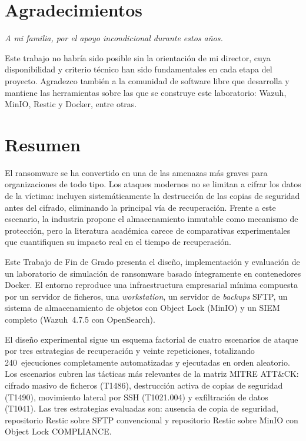 \documentclass[12pt,twoside]{book}
\begin{document}

\chapter*{Agradecimientos}
\thispagestyle{empty}

\begin{flushright}
\textit{A mi familia, por el apoyo incondicional durante estos años.}
\end{flushright}

Este trabajo no habría sido posible sin la orientación de mi director, cuya
disponibilidad y criterio técnico han sido fundamentales en cada etapa del proyecto.
Agradezco también a la comunidad de software libre que desarrolla y mantiene las
herramientas sobre las que se construye este laboratorio: Wazuh, MinIO, Restic y
Docker, entre otras.

\cleardoublepage

\chapter*{Resumen}

El ransomware se ha convertido en una de las amenazas más graves para organizaciones
de todo tipo. Los ataques modernos no se limitan a cifrar los datos de la víctima:
incluyen sistemáticamente la destrucción de las copias de seguridad antes del
cifrado, eliminando la principal vía de recuperación. Frente a este escenario, la
industria propone el almacenamiento inmutable como mecanismo de protección, pero la
literatura académica carece de comparativas experimentales que cuantifiquen su
impacto real en el tiempo de recuperación.

Este Trabajo de Fin de Grado presenta el diseño, implementación y evaluación de un
laboratorio de simulación de ransomware basado íntegramente en contenedores Docker.
El entorno reproduce una infraestructura empresarial mínima compuesta por un
servidor de ficheros, una \textit{workstation}, un servidor de \textit{backups}
SFTP, un sistema de almacenamiento de objetos con Object Lock (MinIO) y un SIEM
completo (Wazuh~4.7.5 con OpenSearch).

El diseño experimental sigue un esquema factorial de cuatro escenarios de ataque
por tres estrategias de recuperación y veinte repeticiones, totalizando
240~ejecuciones completamente automatizadas y ejecutadas en orden aleatorio. Los
escenarios cubren las tácticas más relevantes de la matriz MITRE ATT\&CK: cifrado
masivo de ficheros (T1486), destrucción activa de copias de seguridad (T1490),
movimiento lateral por SSH (T1021.004) y exfiltración de datos (T1041). Las tres
estrategias evaluadas son: ausencia de copia de seguridad, repositorio Restic sobre
SFTP convencional y repositorio Restic sobre MinIO con Object Lock COMPLIANCE.
\end{document}
